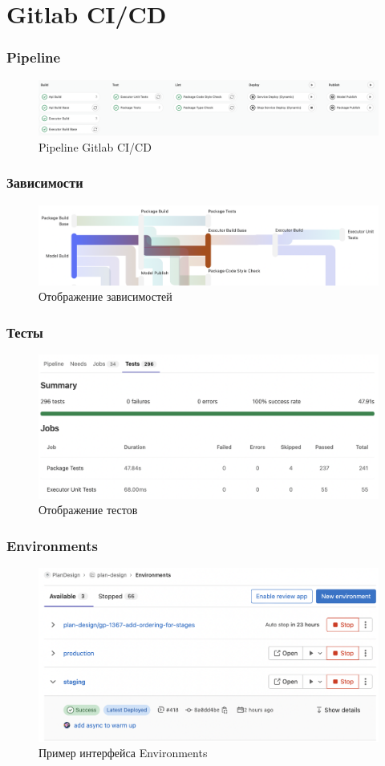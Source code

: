 \section{Gitlab CI/CD}

\begin{frame}
\frametitle{Pipeline}
\begin{figure}
    \includegraphics[scale=.3]{pictures/implementation/stages}
    \caption{Pipeline Gitlab CI/CD}
\end{figure}
\end{frame}

\begin{frame}
\frametitle{Зависимости}
\begin{figure}
    \includegraphics[scale=.45]{pictures/implementation/dependencies}
    \caption{Отображение зависимостей}
\end{figure}
\end{frame}


\begin{frame}
\frametitle{Тесты}
\begin{figure}
    \includegraphics[scale=.4]{pictures/implementation/tests}
    \caption{Отображение тестов}
\end{figure}
\end{frame}


\begin{frame}
\frametitle{Environments}
\begin{figure}
    \includegraphics[scale=.45]{pictures/implementation/environment}
    \caption{Пример интерфейса Environments}
\end{figure}
\end{frame}



